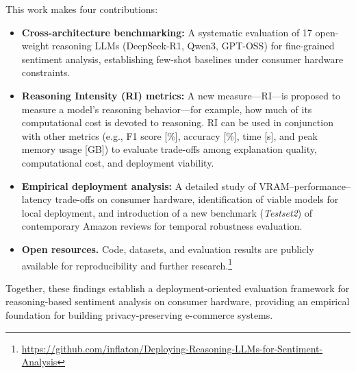 \documentclass[conference]{IEEEtran}
\begin{document}
This work makes four contributions:
\begin{itemize}[leftmargin=*,nosep]
    \item \textbf{Cross-architecture benchmarking:} A systematic evaluation of 17 open-weight reasoning LLMs (DeepSeek-R1, Qwen3, GPT-OSS) for fine-grained sentiment analysis, establishing few-shot baselines under consumer hardware constraints.  
    
    
    \item \textbf{Reasoning Intensity (RI) metrics:} A new measure—RI—is proposed to measure a model’s reasoning behavior—for example, how much of its computational cost is devoted to reasoning. RI can be used in conjunction with other metrics (e.g., F1 score [\%], accuracy [\%], time [s], and peak memory usage [GB]) to evaluate trade-offs among explanation quality, computational cost, and deployment viability.
    
    \item \textbf{Empirical deployment analysis:} A detailed study of VRAM–performance–latency trade-offs on consumer hardware, identification of viable models for local deployment, and introduction of a new benchmark (\textit{Testset2}) of contemporary Amazon reviews for temporal robustness evaluation.  
    
    \item \textbf{Open resources.} Code, datasets, and evaluation results are publicly available for reproducibility and further research.\footnote{\url{https://github.com/inflaton/Deploying-Reasoning-LLMs-for-Sentiment-Analysis}}
\end{itemize}

Together, these findings establish a deployment-oriented evaluation framework for reasoning-based sentiment analysis on consumer hardware, providing an empirical foundation for building privacy-preserving e-commerce systems.
\end{document}
